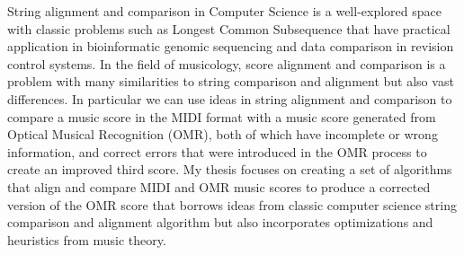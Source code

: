 % 
% 
%
String alignment and comparison in Computer Science is a well-explored space with classic problems such as Longest Common Subsequence that have practical application in bioinformatic genomic sequencing and data comparison in revision control systems. In the field of musicology, score alignment and comparison is a problem with many similarities to string comparison and alignment but also vast differences. In particular we can use ideas in string alignment and comparison to compare a music score in the MIDI format with a music score generated from Optical Musical Recognition (OMR), both of which have incomplete or wrong information, and correct errors that were introduced in the OMR process to create an improved third score. My thesis focuses on creating a set of algorithms that align and compare MIDI and OMR music scores to produce a corrected version of the OMR score that borrows ideas from classic computer science string comparison and alignment algorithm but also incorporates optimizations and heuristics from music theory. 
